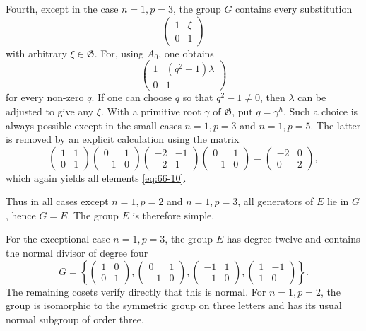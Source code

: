 \documentclass[11pt,a4paper]{article}
\begin{document}
Fourth, except in the case \(n=1,p=3\), the group \(G\) contains every substitution
\begin{equation}\label{eq:66-10}
 \begin{pmatrix}1&\xi\\0&1\end{pmatrix}
\end{equation}
with arbitrary \(\xi\in\mathfrak G\).  For, using \(A_0\), one obtains
\begin{equation}\label{eq:66-11}
 \begin{pmatrix}1&(q^2-1)\lambda\\0&1\end{pmatrix}
\end{equation}
for every non-zero \(q\).  If one can choose \(q\) so that \(q^2-1\ne0\), then \(\lambda\) can be adjusted to give any \(\xi\).  With a primitive root \(\gamma\) of \(\mathfrak G\), put \(q=\gamma^h\).  Such a choice is always possible except in the small cases \(n=1,p=3\) and \(n=1,p=5\).  The latter is removed by an explicit calculation using the matrix
\[
 \begin{pmatrix}1&1\\0&1\end{pmatrix}
 \begin{pmatrix}0&1\\-1&0\end{pmatrix}
 \begin{pmatrix}-2&-1\\-2&1\end{pmatrix}
 \begin{pmatrix}0&1\\-1&0\end{pmatrix}
 =
 \begin{pmatrix}-2&0\\0&2\end{pmatrix},
\]
which again yields all elements \eqref{eq:66-10}.

Thus in all cases except \(n=1,p=2\) and \(n=1,p=3\), all generators of \(E\) lie in \(G\), hence \(G=E\).  The group \(E\) is therefore simple.

For the exceptional case \(n=1,p=3\), the group \(E\) has degree twelve and contains the normal divisor of degree four
\begin{equation}\label{eq:66-exception3}
 G=\left\{
 \begin{pmatrix}1&0\\0&1\end{pmatrix},
 \begin{pmatrix}0&1\\-1&0\end{pmatrix},
 \begin{pmatrix}-1&1\\-1&0\end{pmatrix},
 \begin{pmatrix}1&-1\\1&0\end{pmatrix}
 \right\}.
\end{equation}
The remaining cosets verify directly that this is normal.  For \(n=1,p=2\), the group is isomorphic to the symmetric group on three letters and has its usual normal subgroup of order three.
\end{document}
